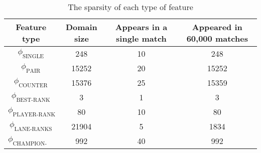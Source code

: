 \begin{center}
\begin{table}[h]
\begin{tabular}{|c|c|c|c|}
\hline
Feature type                & Domain size & Appears in a single match & Appeared in 60,000 matches \\ \hline
$\phi_{\text{SINGLE}}$      & 248         & 10 & 248               \\ \hline
$\phi_{\text{PAIR}}$        & 15252       & 20 & 15252             \\ \hline
$\phi_{\text{COUNTER}}$     & 15376       & 25 & 15359             \\ \hline
$\phi_{\text{BEST-RANK}}$   & 3           & 1  & 3                 \\ \hline
$\phi_{\text{PLAYER-RANK}}$ & 80          & 10 & 80                \\ \hline
$\phi_{\text{LANE-RANKS}}$  & 21904       & 5  & 1834              \\ \hline
$\phi_{\text{CHAMPION-LANE}}$ & 992       & 40 & 992               \\ \hline
\end{tabular}
\caption{The sparsity of each type of feature}\label{tab:featuresparsity}
\end{table}
\end{center}

